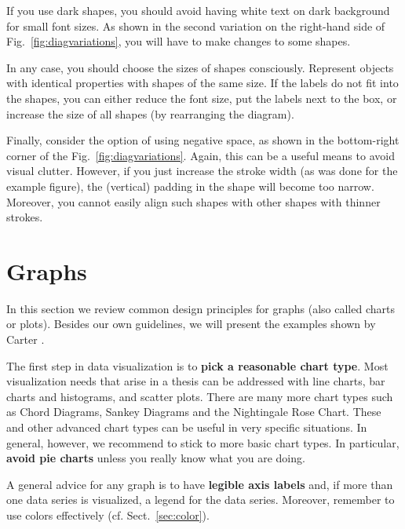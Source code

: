 If you use dark shapes, you should avoid having white text on dark background for small font sizes. As shown in the second variation on the right-hand side of Fig.~\ref{fig:diagvariations}, you will have to make changes to some shapes.

In any case, you should choose the sizes of shapes consciously. Represent objects with identical properties with shapes of the same size. If the labels do not fit into the shapes, you can either reduce the font size, put the labels next to the box, or increase the size of all shapes (by rearranging the diagram).

Finally, consider the option of using negative space, as shown in the bottom-right corner of the Fig.~\ref{fig:diagvariations}. Again, this can be a useful means to avoid visual clutter. However, if you just increase the stroke width (as was done for the example figure), the (vertical) padding in the shape will become too narrow. Moreover, you cannot easily align such shapes with other shapes with thinner strokes.


\section{Graphs}

In this section we review common design principles for graphs (also called charts or plots). Besides our own guidelines, we will present the examples shown by Carter \cite{Carter12}.

The first step in data visualization is to \textbf{pick a reasonable chart type}. Most visualization needs that arise in a thesis can be addressed with line charts, bar charts and histograms, and scatter plots. There are many more chart types such as Chord Diagrams, Sankey Diagrams and the Nightingale Rose Chart.
These and other advanced chart types can be useful in very specific situations. In general, however, we recommend to stick to more basic chart types. In particular, \textbf{avoid pie charts} unless you really know what you are doing.

A general advice for any graph is to have \textbf{legible axis labels} and, if more than one data series is visualized, a legend for the data series. Moreover, remember to use colors effectively (cf. Sect.~\ref{sec:color}).

